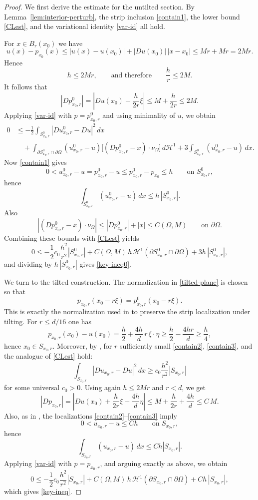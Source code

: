 \documentclass[reqno,11pt]{amsart}
\numberwithin{equation}{section}
\theoremstyle{remark}
\begin{document}
\begin{proof}
We first derive the estimate for the untilted section. By
Lemma~\ref{lem:interior-perturb}, the strip inclusion \eqref{contain1}, the
lower bound \eqref{CLest}, and the variational identity \eqref{var-id} all hold.

For \(x\in B_r(x_0)\) we have
\[
u(x)-p_{x_0}(x)
\le |u(x)-u(x_0)|+|Du(x_0)|\,|x-x_0|
\le Mr+Mr=2Mr.
\]
Hence
\[
h\le 2Mr,
\qquad\text{and therefore}\qquad
\frac{h}{r}\le 2M.
\]
It follows that
\[
|Dp_{x_0,r}^0|
= \left|Du(x_0)+\frac{h}{2r}\xi\right|
\le M+\frac{h}{2r}\le 2M.
\]
Applying \eqref{var-id} with \(p=p_{x_0,r}^0\) and using minimality of \(u\), we obtain
\begin{align*}
0
&\le -\frac12\int_{S_{x_0,r}^0}|Du_{x_0,r}^0-Du|^2\,dx \\
&\quad +\int_{\partial S_{x_0,r}^0\cap\partial\Omega}
(u_{x_0,r}^0-u)\bigl[(Dp_{x_0,r}^0-x)\cdot\nu_\Omega\bigr]\,d\mathscr H^1
+3\int_{S_{x_0,r}^0}(u_{x_0,r}^0-u)\,dx.
\end{align*}
Now \eqref{contain1} gives
\[
0<u_{x_0,r}^0-u=p_{x_0,r}^0-u\le p_{x_0,r}^0-p_{x_0}\le h
\qquad\text{on }S_{x_0,r}^0,
\]
hence
\[
\int_{S_{x_0,r}^0}(u_{x_0,r}^0-u)\,dx\le h\,|S_{x_0,r}^0|.
\]
Also
\[
|(Dp_{x_0,r}^0-x)\cdot\nu_\Omega|
\le |Dp_{x_0,r}^0|+|x|
\le C(\Omega,M)
\qquad\text{on }\partial\Omega.
\]
Combining these bounds with \eqref{CLest} yields
\[
0\le
-\frac12 c_0\frac{h^2}{r^2}|S_{x_0,r}^0|
+C(\Omega,M)\,h\,\mathscr H^1(\partial S_{x_0,r}^0\cap\partial\Omega)
+3h\,|S_{x_0,r}^0|,
\]
and dividing by \(h\,|S_{x_0,r}^0|\) gives \eqref{key-ineq0}.

We turn to the tilted construction. The normalization in \eqref{tilted-plane}
is chosen so that
\[
p_{x_0,r}(x_0-r\xi)=p_{x_0,r}^0(x_0-r\xi).
\]
This is exactly the normalization used in \cite[Proof of Theorem~4.1]{MRZ20252}
to preserve the strip localization under tilting. For \(r\le d/16\) one has
\[
p_{x_0,r}(x_0)-u(x_0)
=
\frac h2+\frac{4h}{d}\,r\,\xi\cdot\eta
\ge \frac h2-\frac{4hr}{d}
\ge \frac h4,
\]
hence \(x_0\in S_{x_0,r}\). Moreover, by
\cite[Proof of Theorem~4.1]{MRZ20252}, for \(r\) sufficiently small
\eqref{contain2}, \eqref{contain3}, and the analogue of \eqref{CLest} hold:
\[
\int_{S_{x_0,r}} |Du_{x_0,r}-Du|^2\,dx
\ge c_0\frac{h^2}{r^2}|S_{x_0,r}|
\]
for some universal \(c_0>0\).
Using again \(h\le 2Mr\) and \(r<d\), we get
\[
|Dp_{x_0,r}|
=
\left|Du(x_0)+\frac{h}{2r}\xi+\frac{4h}{d}\eta\right|
\le M+\frac{h}{2r}+\frac{4h}{d}
\le C\,M.
\]
Also, as in \cite[Proof of Theorem~4.1]{MRZ20252}, the localizations
\eqref{contain2}--\eqref{contain3} imply
\[
0<u_{x_0,r}-u\le C h
\qquad\text{on }S_{x_0,r},
\]
hence
\[
\int_{S_{x_0,r}}(u_{x_0,r}-u)\,dx\le C h |S_{x_0,r}|.
\]
Applying \eqref{var-id} with \(p=p_{x_0,r}\), and arguing exactly as above, we
obtain
\[
0\le
-\frac12 c_0\frac{h^2}{r^2}|S_{x_0,r}|
+C(\Omega,M)\,h\,\mathscr H^1(\partial S_{x_0,r}\cap\partial\Omega)
+C h\,|S_{x_0,r}|,
\]
which gives \eqref{key-ineq}.
\end{proof}
\end{document}
